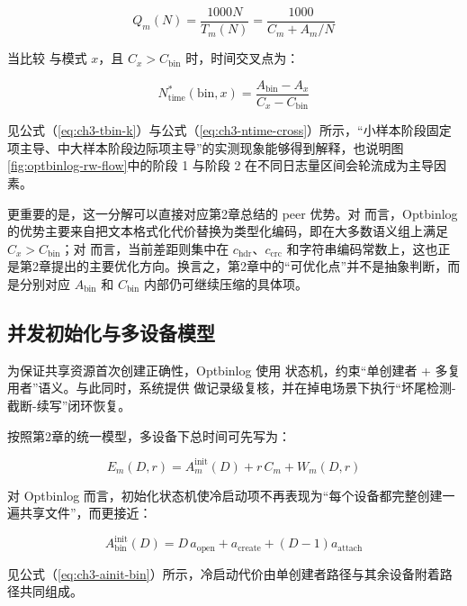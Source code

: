 \[
Q_m(N)=\frac{1000N}{T_m(N)}=\frac{1000}{C_m+A_m/N}
\]

当比较  与模式 \(x\)，且 \(C_x>C_{\text{bin}}\) 时，时间交叉点为：

\begin{equation}
N_{\text{time}}^*(\text{bin},x)=\frac{A_{\text{bin}}-A_x}{C_x-C_{\text{bin}}}
\label{eq:ch3-ntime-cross}
\end{equation}

见公式（\ref{eq:ch3-tbin-k}）与公式（\ref{eq:ch3-ntime-cross}）所示，``小样本阶段固定项主导、中大样本阶段边际项主导''的实测现象能够得到解释，也说明图\ref{fig:optbinlog-rw-flow}中的阶段 1 与阶段 2 在不同日志量区间会轮流成为主导因素。

更重要的是，这一分解可以直接对应第2章总结的 peer 优势。对  而言，Optbinlog 的优势主要来自把文本格式化代价替换为类型化编码，即在大多数语义组上满足 \(C_x>C_{\text{bin}}\)；对  而言，当前差距则集中在 \(c_{\text{hdr}}\)、\(c_{\text{crc}}\) 和字符串编码常数上，这也正是第2章提出的主要优化方向。换言之，第2章中的``可优化点''并不是抽象判断，而是分别对应 \(A_{\text{bin}}\) 和 \(C_{\text{bin}}\) 内部仍可继续压缩的具体项。

\subsection{并发初始化与多设备模型}\label{ux5e76ux53d1ux521dux59cbux5316ux4e0eux591aux8bbeux5907ux6a21ux578b}

为保证共享资源首次创建正确性，Optbinlog 使用  \textrightarrow{}  状态机，约束``单创建者 + 多复用者''语义。与此同时，系统提供  做记录级复核，并在掉电场景下执行``坏尾检测-截断-续写''闭环恢复。

按照第2章的统一模型，多设备下总时间可先写为：

\[
E_m(D,r)=A^{\text{init}}_m(D)+r\,C_m+W_m(D,r)
\]

对 Optbinlog 而言，初始化状态机使冷启动项不再表现为``每个设备都完整创建一遍共享文件''，而更接近：

\begin{equation}
A^{\text{init}}_{\text{bin}}(D)=D\,a_{\text{open}}+a_{\text{create}}+(D-1)a_{\text{attach}}
\label{eq:ch3-ainit-bin}
\end{equation}

见公式（\ref{eq:ch3-ainit-bin}）所示，冷启动代价由单创建者路径与其余设备附着路径共同组成。

